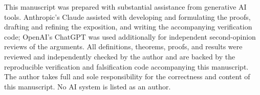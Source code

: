 \documentclass[11pt,reqno]{amsart}
\theoremstyle{plain}
\theoremstyle{definition}
\theoremstyle{remark}
\begin{document}
This manuscript was prepared with substantial assistance from generative AI
tools. Anthropic's Claude assisted with developing and formulating the proofs,
drafting and refining the exposition, and writing the accompanying verification
code; OpenAI's ChatGPT was used additionally for independent second-opinion
reviews of the arguments. All definitions, theorems, proofs, and results were
reviewed and independently checked by the author and are backed by the
reproducible verification and falsification code accompanying this manuscript. The author takes
full and sole responsibility for the correctness and content of this
manuscript. No AI system is listed as an author.



\end{document}
